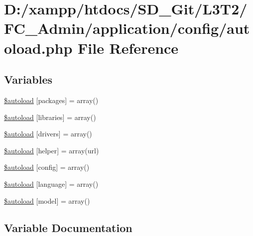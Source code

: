 \hypertarget{_admin_2application_2config_2autoload_8php}{}\section{D\+:/xampp/htdocs/\+S\+D\+\_\+\+Git/\+L3\+T2/\+F\+C\+\_\+\+Admin/application/config/autoload.php File Reference}
\label{_admin_2application_2config_2autoload_8php}
\subsection*{Variables}
\begin{DoxyCompactItemize}
\item 
\hyperlink{_admin_2application_2config_2autoload_8php_ab562c5bbb18f14d6b6b7014d9166625d}{\$autoload} \mbox{[}\textquotesingle{}packages\textquotesingle{}\mbox{]} = array()
\item 
\hyperlink{_admin_2application_2config_2autoload_8php_ab86d0a1a62e12b528eacaa7100bc4d93}{\$autoload} \mbox{[}\textquotesingle{}libraries\textquotesingle{}\mbox{]} = array()
\item 
\hyperlink{_admin_2application_2config_2autoload_8php_ab5159fd0a997ccee7145f373cdab896f}{\$autoload} \mbox{[}\textquotesingle{}drivers\textquotesingle{}\mbox{]} = array()
\item 
\hyperlink{_admin_2application_2config_2autoload_8php_aa98014ce8ad854ad9500e65ff159272d}{\$autoload} \mbox{[}\textquotesingle{}helper\textquotesingle{}\mbox{]} = array(\textquotesingle{}url\textquotesingle{})
\item 
\hyperlink{_admin_2application_2config_2autoload_8php_ac051887e192979c0320e05821bad8f33}{\$autoload} \mbox{[}\textquotesingle{}config\textquotesingle{}\mbox{]} = array()
\item 
\hyperlink{_admin_2application_2config_2autoload_8php_addfee4f4b38a8235172cb173995a9c0b}{\$autoload} \mbox{[}\textquotesingle{}language\textquotesingle{}\mbox{]} = array()
\item 
\hyperlink{_admin_2application_2config_2autoload_8php_a942b884082b1defda7fb10ee71bba324}{\$autoload} \mbox{[}\textquotesingle{}model\textquotesingle{}\mbox{]} = array()
\end{DoxyCompactItemize}


\subsection{Variable Documentation}
\hypertarget{_admin_2application_2config_2autoload_8php_ab562c5bbb18f14d6b6b7014d9166625d}{}
